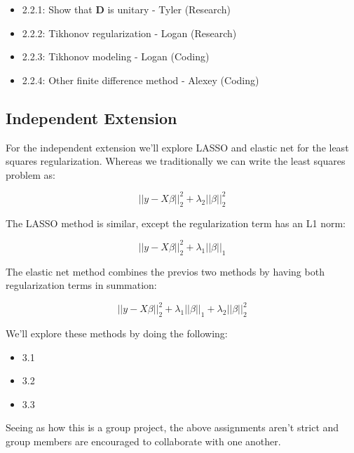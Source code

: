\documentclass{article}
\begin{document}
    \begin{itemize}
        \item 2.2.1: Show that $\textbf{D}$ is unitary - Tyler (Research)
        \item 2.2.2: Tikhonov regularization - Logan (Research)
        \item 2.2.3: Tikhonov modeling - Logan (Coding)
        \item 2.2.4: Other finite difference method - Alexey (Coding)
    \end{itemize}

    \subsection{Independent Extension}

    For the independent extension we'll explore LASSO and elastic net for the least squares regularization. Whereas we traditionally we can write the least squares problem as:

    \begin{equation*}
        ||y-X\beta||^{2}_{2} + \lambda_2 ||\beta||_{2}^{2}
    \end{equation*}

    The LASSO method is similar, except the regularization term has an L1 norm:

    \begin{equation*}
        ||y-X\beta||^{2}_{2} + \lambda_1 ||\beta||_{1}
    \end{equation*}

    The elastic net method combines the previos two methods by having both regularization terms in summation:

    \begin{equation*}
        ||y-X\beta||^{2}_{2} + \lambda_1 ||\beta||_{1} + \lambda_2 ||\beta||_{2}^{2}
    \end{equation*}

    We'll explore these methods by doing the following:

    \begin{itemize}
        \item 3.1
        \item 3.2
        \item 3.3
    \end{itemize}

    Seeing as how this is a group project, the above assignments aren't strict and group members are encouraged to collaborate with one another.
\end{document}
